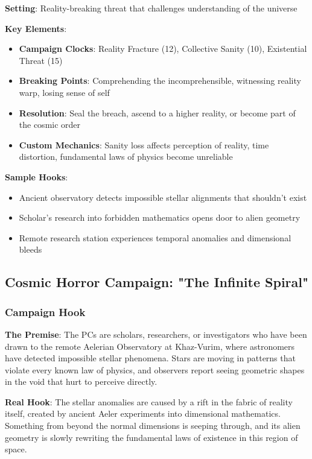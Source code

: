 \documentclass[11pt]{article}
\begin{document}
\begin{mdframed}[backgroundcolor=horrorbg]
\textbf{Setting}: Reality-breaking threat that challenges understanding of the universe

\textbf{Key Elements}:
\begin{itemize}[leftmargin=*]
\item \textbf{Campaign Clocks}: Reality Fracture (12), Collective Sanity (10), Existential Threat (15)
\item \textbf{Breaking Points}: Comprehending the incomprehensible, witnessing reality warp, losing sense of self
\item \textbf{Resolution}: Seal the breach, ascend to a higher reality, or become part of the cosmic order
\item \textbf{Custom Mechanics}: Sanity loss affects perception of reality, time distortion, fundamental laws of physics become unreliable
\end{itemize}

\textbf{Sample Hooks}:
\begin{itemize}[leftmargin=*]
\item Ancient observatory detects impossible stellar alignments that shouldn't exist
\item Scholar's research into forbidden mathematics opens door to alien geometry
\item Remote research station experiences temporal anomalies and dimensional bleeds
\end{itemize}
\end{mdframed}

\subsection*{Cosmic Horror Campaign: "The Infinite Spiral"}

\subsubsection*{Campaign Hook}

\begin{mdframed}[backgroundcolor=horrorbg]
\textbf{The Premise}: The PCs are scholars, researchers, or investigators who have been drawn to the remote Aelerian Observatory at Khaz-Vurim, where astronomers have detected impossible stellar phenomena. Stars are moving in patterns that violate every known law of physics, and observers report seeing geometric shapes in the void that hurt to perceive directly.

\textbf{Real Hook}: The stellar anomalies are caused by a rift in the fabric of reality itself, created by ancient Aeler experiments into dimensional mathematics. Something from beyond the normal dimensions is seeping through, and its alien geometry is slowly rewriting the fundamental laws of existence in this region of space.
\end{mdframed}
\end{document}
